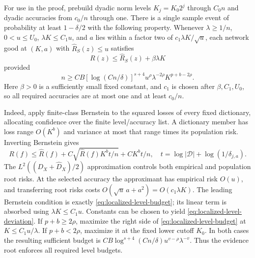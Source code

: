 For use in the proof, prebuild dyadic norm levels $K_j=K_0 2^j$
through $C_0n$ and dyadic accuracies from $c_0/n$ through one.
There is a single sample event of probability at least $1-\delta/2$
with the following property. Whenever $\lambda\ge1/n$,
$0<u\le U_0$, $\lambda K\le C_1u$, and $a$ lies within a factor two
of $c_1\lambda K/\sqrt u$, each network good at $(K,a)$ with
$\widehat R_S(z)\le u$ satisfies
\begin{equation}
 R(z)\le\widehat R_S(z)+\beta\lambda K
 \label{eq:localized-level-deviation}
\end{equation}
provided
\begin{equation}
 n\ge C B[\log(Cn/\delta)]^{s+4}
       u^\rho\lambda^{-2\rho}K^{p+b-2\rho}.
 \label{eq:localized-level-budget}
\end{equation}
Here $\beta>0$ is a sufficiently small fixed constant, and $c_1$
is chosen after $\beta,C_1,U_0$, so all required accuracies are at most
one and at least $c_0/n$.

Indeed, apply finite-class Bernstein to the squared losses of every
fixed dictionary, allocating confidence over the finite level/accuracy
list. A dictionary member has loss range $O(K^b)$ and variance at most
that range times its population risk. Inverting Bernstein gives
\[
 R(f)\le\widehat R(f)+C\sqrt{\widehat R(f)K^b t/n}+C K^b t/n,
 \quad t=\log|\mathcal D|+\log(1/\delta_{j,a}).
\]
The $L^2((D_X+\widehat D_X)/2)$ approximation controls both empirical
and population root risks. At the selected accuracy the approximant
has empirical risk $O(u)$, and transferring root risks costs
$O(\sqrt u\,a+a^2)=O(c_1\lambda K)$.
The leading Bernstein condition is exactly
\eqref{eq:localized-level-budget}; its linear term is absorbed using
$\lambda K\le C_1u$. Constants can be chosen to yield
\eqref{eq:localized-level-deviation}.
If $p+b\ge2\rho$, maximize the right side of
\eqref{eq:localized-level-budget} at $K\le C_1u/\lambda$.
If $p+b<2\rho$, maximize it at the fixed lower cutoff $K_0$.
In both cases the resulting sufficient budget is
$C B\log^{s+4}(Cn/\delta)u^{v-\rho}\lambda^{-v}$.
Thus the evidence root enforces all required level budgets.

